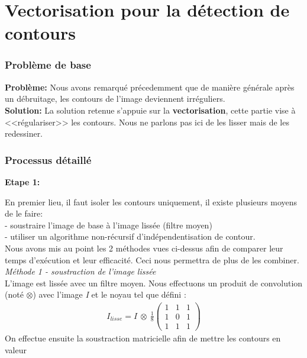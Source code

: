\documentclass{article}
\begin{document}
	\newpage


	\part*{Vectorisation pour la détection de contours}
	
	
		\section{Problème de base}
			\textbf{Problème: }Nous avons remarqué précedemment que de manière générale après un débruitage, les contours de l'image deviennent irréguliers.\\
			\textbf{Solution: }La solution retenue s'appuie sur la \textbf{vectorisation}, cette partie vise à <<régulariser>> les contours. Nous ne parlons pas ici de les lisser mais de les redessiner.\\
		
		
		\section{Processus détaillé}
			\textbf{Etape 1: }\par
			En premier lieu, il faut isoler les contours uniquement, il existe plusieurs moyens de le faire:\\
			- soustraire l'image de base à l'image lissée (filtre moyen)\\
			- utiliser un algorithme non-récursif d'indépendentisation de contour.\\
			Nous avons mis au point les 2 méthodes vues ci-dessus afin de comparer leur temps d'exécution et leur efficacité. Ceci nous permettra de plus de les combiner.\\
			
			\indent	\emph{Méthode 1 - soustraction de l'image lissée}\\
			L'image est lissée avec un filtre moyen. Nous effectuons un produit de convolution (noté \begin{math}\otimes\end{math}) avec l'image \emph{I} et le noyau tel que défini :
			\begin{align*}
				I_{lisse} = I\ \otimes\ \frac{1}{8} \begin{pmatrix}
					1 & 1 & 1\\
					1 & 0 & 1\\
					1 & 1 & 1
				\end{pmatrix} 
			\end{align*}
			On effectue ensuite la soustraction matricielle afin de mettre les contours en valeur\\
			
\end{document}

